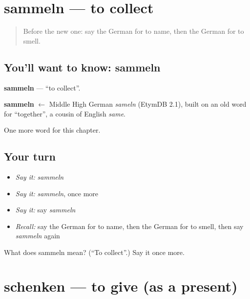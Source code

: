 \section[sammeln]{sammeln — to collect}

\label{lesson:GE-C149-sammeln}



\begin{quote}
Before the new one: say the German for to name, then the German for to smell.
\end{quote}

\subsection*{You'll want to know: sammeln}
\textbf{sammeln} — \textquotedblleft{}to collect\textquotedblright{}.

\begin{cousinweb}
\textbf{sammeln} $\leftarrow$ Middle High German \emph{sameln} (EtymDB 2.1), built on an old word for \textquotedblleft{}together\textquotedblright{}, a cousin of English \emph{same}.
\end{cousinweb}

\begin{grammarlens}[title={What you've built}]
One more word for this chapter.
\end{grammarlens}

\subsection*{Your turn}
\begin{itemize}
\raggedright
  \item \emph{Say it:} \emph{sammeln}
  \item \emph{Say it:} \emph{sammeln}, once more
  \item \emph{Say it:} say \emph{sammeln}
  \item \emph{Recall:} say the German for to name, then the German for to smell, then say \emph{sammeln} again
\end{itemize}

\begin{tcolorbox}[breakable,colback=teal!4,colframe=teal!35!black,title={Before you move on}]
What does sammeln mean? (\textquotedblleft{}To collect\textquotedblright{}.) Say it once more.
\end{tcolorbox}
\section[schenken]{schenken — to give (as a present)}

